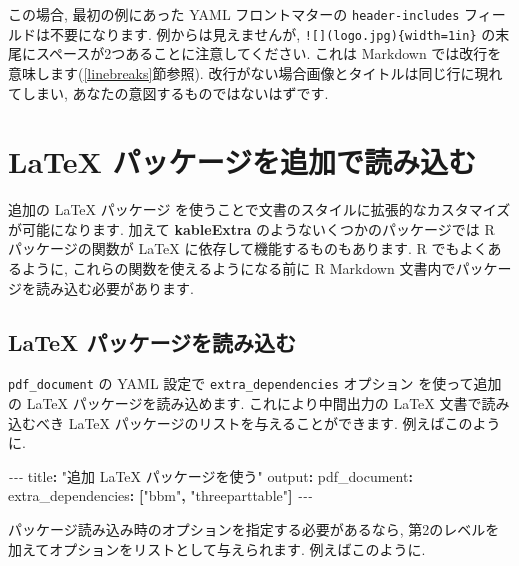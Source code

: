\documentclass[
  11pt,
  lualatex,ja=standard,jafont=noto]{bxjsreport}
\newenvironment{Shaded}{\begin{snugshade}}{\end{snugshade}}
\newcommand{\AttributeTok}[1]{\textcolor[rgb]{0.77,0.63,0.00}{#1}}
\newcommand{\FunctionTok}[1]{\textcolor[rgb]{0.00,0.00,0.00}{#1}}
\newcommand{\KeywordTok}[1]{\textcolor[rgb]{0.13,0.29,0.53}{\textbf{#1}}}
\newcommand{\PreprocessorTok}[1]{\textcolor[rgb]{0.56,0.35,0.01}{\textit{#1}}}
\newcommand{\StringTok}[1]{\textcolor[rgb]{0.31,0.60,0.02}{#1}}
\begin{document}
この場合, 最初の例にあった YAML フロントマターの \texttt{header-includes} フィールドは不要になります. 例からは見えませんが, \texttt{!{[}{]}(logo.jpg)\{width=1in\}} の末尾にスペースが2つあることに注意してください. これは Markdown では改行を意味します(\ref{linebreaks}節参照). 改行がない場合画像とタイトルは同じ行に現れてしまい, あなたの意図するものではないはずです.

\hypertarget{latex-extra}{%
\section{LaTeX パッケージを追加で読み込む}\label{latex-extra}}

追加の LaTeX パッケージ を使うことで文書のスタイルに拡張的なカスタマイズが可能になります. 加えて \textbf{kableExtra} \autocite{R-kableExtra} のようないくつかのパッケージでは R パッケージの関数が LaTeX に依存して機能するものもあります. R でもよくあるように, これらの関数を使えるようになる前に R Markdown 文書内でパッケージを読み込む必要があります.

\hypertarget{loading-latex-packages}{%
\subsection{LaTeX パッケージを読み込む}\label{loading-latex-packages}}

\texttt{pdf\_document} の YAML 設定で \texttt{extra\_dependencies} オプション を使って追加の LaTeX パッケージを読み込めます. これにより中間出力の LaTeX 文書で読み込むべき LaTeX パッケージのリストを与えることができます. 例えばこのように.

\begin{Shaded}
\begin{Highlighting}[]
\PreprocessorTok{{-}{-}{-}}
\FunctionTok{title}\KeywordTok{:}\AttributeTok{ }\StringTok{"追加 LaTeX パッケージを使う"}
\FunctionTok{output}\KeywordTok{:}
\AttributeTok{  }\FunctionTok{pdf\_document}\KeywordTok{:}
\AttributeTok{    }\FunctionTok{extra\_dependencies}\KeywordTok{:}\AttributeTok{ }\KeywordTok{[}\StringTok{"bbm"}\KeywordTok{,}\AttributeTok{ }\StringTok{"threeparttable"}\KeywordTok{]}
\PreprocessorTok{{-}{-}{-}}
\end{Highlighting}
\end{Shaded}

パッケージ読み込み時のオプションを指定する必要があるなら, 第2のレベルを加えてオプションをリストとして与えられます. 例えばこのように.
\end{document}
